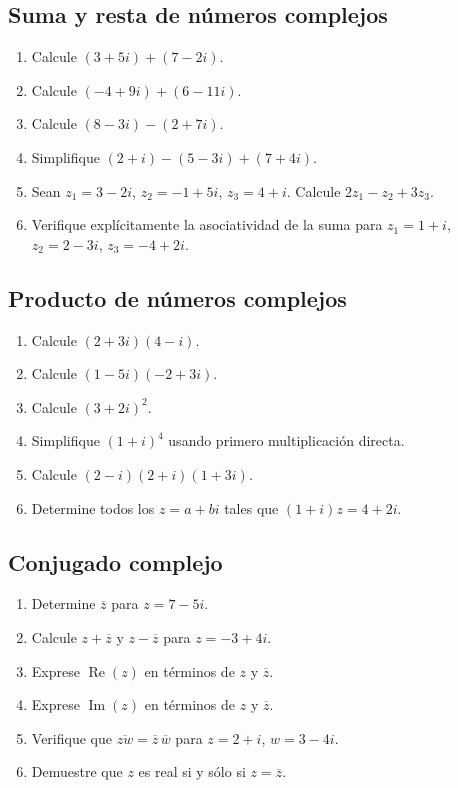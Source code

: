 \documentclass[12pt]{article}
\begin{document}
\subsection*{Suma y resta de números complejos}
\begin{enumerate}
\item Calcule $(3+5i)+(7-2i)$.
\item Calcule $(-4+9i)+(6-11i)$.
\item Calcule $(8-3i)-(2+7i)$.
\item Simplifique $(2+i)-(5-3i)+(7+4i)$.
\item Sean $z_1=3-2i$, $z_2=-1+5i$, $z_3=4+i$. Calcule $2z_1-z_2+3z_3$.
\item Verifique explícitamente la asociatividad de la suma para $z_1=1+i$, $z_2=2-3i$, $z_3=-4+2i$.
\end{enumerate}

\subsection*{Producto de números complejos}
\begin{enumerate}
\item Calcule $(2+3i)(4-i)$.
\item Calcule $(1-5i)(-2+3i)$.
\item Calcule $(3+2i)^2$.
\item Simplifique $(1+i)^4$ usando primero multiplicación directa.
\item Calcule $(2-i)(2+i)(1+3i)$.
\item Determine todos los $z=a+bi$ tales que $(1+i)z=4+2i$.
\end{enumerate}

\subsection*{Conjugado complejo}
\begin{enumerate}
\item Determine $\overline z$ para $z=7-5i$.
\item Calcule $z+\overline z$ y $z-\overline z$ para $z=-3+4i$.
\item Exprese $\operatorname{Re}(z)$ en términos de $z$ y $\overline z$.
\item Exprese $\operatorname{Im}(z)$ en términos de $z$ y $\overline z$.
\item Verifique que $\overline{zw}=\overline z\,\overline w$ para $z=2+i$, $w=3-4i$.
\item Demuestre que $z$ es real si y sólo si $z=\overline z$.
\end{enumerate}
\end{document}
